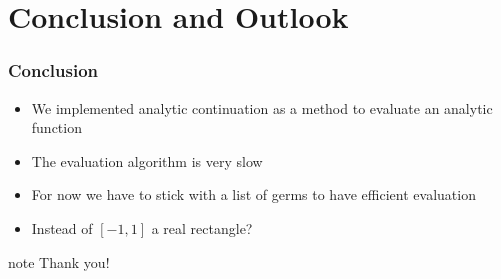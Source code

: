 \documentclass[xcolor=pdftex,dvipsnames,table]{beamer}
\begin{document}
\section{Conclusion and Outlook}
\begin{frame}[<+->]
\frametitle{Conclusion}
\begin{itemize}
\item We implemented analytic continuation as a method to evaluate an analytic function
\item The evaluation algorithm is very slow
\item For now we have to stick with a list of germs to have efficient evaluation
\item Instead of $[-1,1]$ a real rectangle?

\end{itemize}
\end{frame}
\begin{frame}

    \vspace{\fill}
\begin{beamercolorbox}[center,shadow=true,rounded=true]{note} 
        \huge Thank you!
\end{beamercolorbox}

    \vspace{\fill}
\end{frame} 
\end{document}
